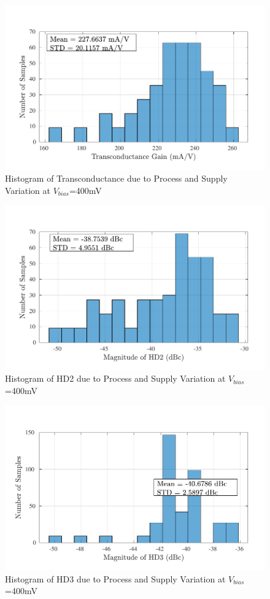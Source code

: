 \begin{figure} [H]
\centering
\includegraphics[scale=1]{Figures/Corners/Overall/PV_Mid/PDFs/PV_Mid_gm.pdf}
\caption{Histogram of Transconductance due to Process and Supply Variation at $V_{bias}$=400mV}
\end{figure}

\begin{figure} [H]
\centering
\includegraphics[scale=1]{Figures/Corners/Overall/PV_Mid/PDFs/PV_Mid_hd2.pdf}
\caption{Histogram of HD2 due to Process and Supply Variation at $V_{bias}$=400mV}
\end{figure}

\begin{figure} [H]
\centering
\includegraphics[scale=1]{Figures/Corners/Overall/PV_Mid/PDFs/PV_Mid_hd3.pdf}
\caption{Histogram of HD3 due to Process and Supply Variation at $V_{bias}$=400mV}
\end{figure}

